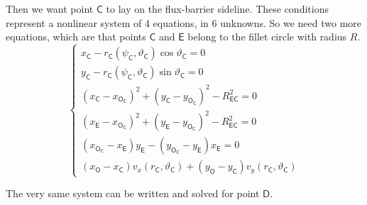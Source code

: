 \documentclass[b5paper,11pt,oneside,fleqn]{article}
\newcommand{\pt}[1]{\mathsf{#1}}
\newcommand{\te}{\vartheta}
\begin{document}
Then we want point $ \pt{C} $ to lay on the flux-barrier sideline. These 
conditions represent a nonlinear system of 4 equations, in 6 unknowns.
So we need two more equations, which are that points $ \pt{C} $ and $ \pt{E} $ 
belong to the fillet circle with radius $ R $.
\begin{equation}
\begin{cases}
x_\pt{C} - r_\pt{C}(\psi_\pt{C}, \te_\pt{C}) \cos\te_\pt{C} = 0 \\
y_\pt{C} - r_\pt{C}(\psi_\pt{C}, \te_\pt{C}) \sin\te_\pt{C} = 0 \\
%
(x_\pt{C} - x_\pt{O_\pt{C}})^2 + (y_\pt{C} - y_\pt{O_\pt{C}})^2 
- R_\pt{EC}^2 = 0 \\
(x_\pt{E} - x_\pt{O_\pt{C}})^2 + (y_\pt{E} - y_\pt{O_\pt{C}})^2 
- R_\pt{EC}^2 = 0 \\
%
(x_\pt{O_\pt{C}} - x_\pt{E}) y_\pt{E} - 
(y_\pt{O_\pt{C}} - y_\pt{E}) x_\pt{E} = 0 \\
%
(x_\pt{O} - x_\pt{C}) v_x(r_\pt{C},\te_\pt{C}) + 
(y_\pt{O} - y_\pt{C}) v_y(r_\pt{C},\te_\pt{C}) 
\end{cases}
\end{equation}

The very same system can be written and solved for point $ \pt{D} $.
\end{document}
